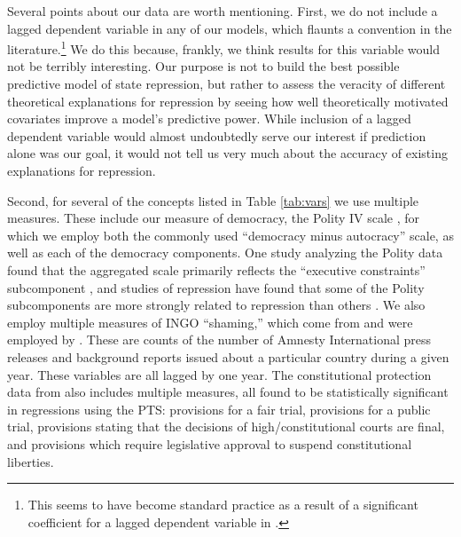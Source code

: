 \documentclass[12pt]{article}
\begin{document}
Several points about our data are worth mentioning. First, we do not include a lagged dependent variable in any of our models, which flaunts a convention in the literature.\footnote{This seems to have become standard practice as a result of a significant coefficient for a lagged dependent variable in \citet{PoeTate1994}.} We do this because, frankly, we think results for this variable would not be terribly interesting. Our purpose is not to build the best possible predictive model of state repression, but rather to assess the veracity of different theoretical explanations for repression by seeing how well theoretically motivated covariates improve a model's predictive power. While inclusion of a lagged dependent variable would almost undoubtedly serve our interest if prediction alone was our goal, it would not tell us very much about the accuracy of existing explanations for repression. 

Second, for several of the concepts listed in Table \ref{tab:vars} we use multiple measures. These include our measure of democracy, the Polity IV scale \citep{MarshallJaggers2009}, for which we employ both the commonly used ``democracy minus autocracy'' scale, as well as each of the democracy components. One study analyzing the Polity data found that the aggregated scale primarily reflects the ``executive constraints'' subcomponent \citep{GleditschWard1997}, and studies of repression have found that some of the Polity subcomponents are more strongly related to repression than others \citep{Keith2002PRQ, BDMetal2005}. We also employ multiple measures of INGO ``shaming,'' which come from \citet{RonRamosRodgers2005} and were employed by \citet{HafnerBurton2008}. These are counts of the number of Amnesty International press releases and background reports issued about a particular country during a given year. These variables are all lagged by one year. The constitutional protection data from \citet{KeithTatePoe2009} also includes multiple measures, all found to be statistically significant in regressions using the PTS: provisions for a fair trial, provisions for a public trial, provisions stating that the decisions of high/constitutional courts are final, and provisions which require legislative approval to suspend constitutional liberties. 
\end{document}
